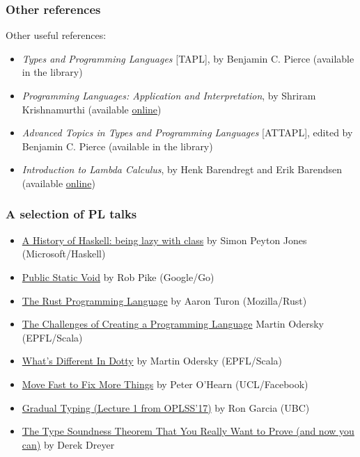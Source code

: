 \begin{frame}
  \frametitle{Other references}
  Other useful references:
  \begin{itemize}
  \item \emph{Types and Programming Languages} [TAPL], by Benjamin C. Pierce
    (available in the library)
  \item \emph{Programming Languages: Application and Interpretation},
    by Shriram Krishnamurthi (available
    \href{http://cs.brown.edu/~sk/Publications/Books/ProgLangs/}{online})
  \item \emph{Advanced Topics in Types and Programming Languages} [ATTAPL],
    edited by Benjamin C. Pierce (available in the library)
  \item \emph{Introduction to Lambda Calculus}, by Henk Barendregt and Erik Barendsen
    (available \href{http://www.nyu.edu/projects/barker/Lambda/barendregt.94.pdf}{online})
\end{itemize}
\end{frame}


\begin{frame}
  \frametitle{A selection of PL talks}
  \begin{itemize}
  \item \href{https://www.youtube.com/watch?v=06x8Wf2r2Mc}{A History
      of Haskell: being lazy with class} by Simon Peyton Jones (Microsoft/Haskell)
  \item \href{https://www.youtube.com/watch?v=5kj5ApnhPAE}{Public Static Void} by Rob Pike (Google/Go)
  \item \href{https://www.youtube.com/watch?v=O5vzLKg7y-k}{The Rust Programming Language} by Aaron Turon (Mozilla/Rust)
  \item \href{https://www.youtube.com/watch?v=60nXRNjEeo4}{The
      Challenges of Creating a Programming Language} Martin Odersky
    (EPFL/Scala)
  \item \href{https://www.youtube.com/watch?v=9lWrt6H6UdE}{What's Different In Dotty} by Martin Odersky (EPFL/Scala)
  \item \href{https://www.youtube.com/watch?v=xc72SYVU2QY}{Move Fast to Fix More Things} by Peter O'Hearn (UCL/Facebook)
  \item \href{https://www.youtube.com/watch?v=RoqDQgzwO00}{Gradual Typing (Lecture 1 from OPLSS'17)} by Ron Garcia (UBC)
  \item \href{https://www.youtube.com/watch?v=8Xyk_dGcAwk}{The Type Soundness Theorem That You Really Want to Prove (and now you can)} by Derek Dreyer
  \end{itemize}
\end{frame}




